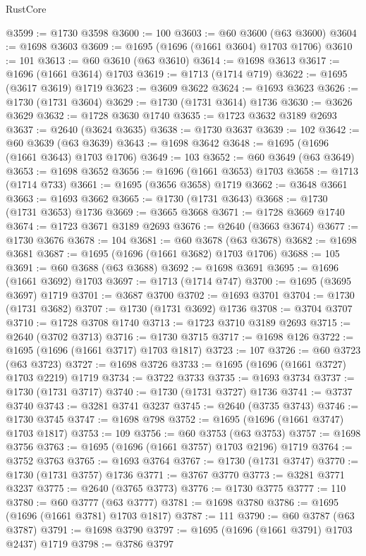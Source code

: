 \begin{lexlean}{RustCore}
\begin{coremodule}
@3599 := @1730 @3598
@3600 := 100
@3603 := @60 @3600 (@63 @3600)
@3604 := @1698 @3603
@3609 := @1695 (@1696 (@1661 @3604) @1703 @1706)
@3610 := 101
@3613 := @60 @3610 (@63 @3610)
@3614 := @1698 @3613
@3617 := @1696 (@1661 @3614) @1703
@3619 := @1713 (@1714 @719)
@3622 := @1695 (@3617 @3619) @1719
@3623 := @3609 @3622
@3624 := @1693 @3623
@3626 := @1730 (@1731 @3604)
@3629 := @1730 (@1731 @3614) @1736
@3630 := @3626 @3629
@3632 := @1728 @3630 @1740
@3635 := @1723 @3632 @3189 @2693
@3637 := @2640 (@3624 @3635)
@3638 := @1730 @3637
@3639 := 102
@3642 := @60 @3639 (@63 @3639)
@3643 := @1698 @3642
@3648 := @1695 (@1696 (@1661 @3643) @1703 @1706)
@3649 := 103
@3652 := @60 @3649 (@63 @3649)
@3653 := @1698 @3652
@3656 := @1696 (@1661 @3653) @1703
@3658 := @1713 (@1714 @733)
@3661 := @1695 (@3656 @3658) @1719
@3662 := @3648 @3661
@3663 := @1693 @3662
@3665 := @1730 (@1731 @3643)
@3668 := @1730 (@1731 @3653) @1736
@3669 := @3665 @3668
@3671 := @1728 @3669 @1740
@3674 := @1723 @3671 @3189 @2693
@3676 := @2640 (@3663 @3674)
@3677 := @1730 @3676
@3678 := 104
@3681 := @60 @3678 (@63 @3678)
@3682 := @1698 @3681
@3687 := @1695 (@1696 (@1661 @3682) @1703 @1706)
@3688 := 105
@3691 := @60 @3688 (@63 @3688)
@3692 := @1698 @3691
@3695 := @1696 (@1661 @3692) @1703
@3697 := @1713 (@1714 @747)
@3700 := @1695 (@3695 @3697) @1719
@3701 := @3687 @3700
@3702 := @1693 @3701
@3704 := @1730 (@1731 @3682)
@3707 := @1730 (@1731 @3692) @1736
@3708 := @3704 @3707
@3710 := @1728 @3708 @1740
@3713 := @1723 @3710 @3189 @2693
@3715 := @2640 (@3702 @3713)
@3716 := @1730 @3715
@3717 := @1698 @126
@3722 := @1695 (@1696 (@1661 @3717) @1703 @1817)
@3723 := 107
@3726 := @60 @3723 (@63 @3723)
@3727 := @1698 @3726
@3733 := @1695 (@1696 (@1661 @3727) @1703 @2219) @1719
@3734 := @3722 @3733
@3735 := @1693 @3734
@3737 := @1730 (@1731 @3717)
@3740 := @1730 (@1731 @3727) @1736
@3741 := @3737 @3740
@3743 := @3281 @3741 @3237
@3745 := @2640 (@3735 @3743)
@3746 := @1730 @3745
@3747 := @1698 @798
@3752 := @1695 (@1696 (@1661 @3747) @1703 @1817)
@3753 := 109
@3756 := @60 @3753 (@63 @3753)
@3757 := @1698 @3756
@3763 := @1695 (@1696 (@1661 @3757) @1703 @2196) @1719
@3764 := @3752 @3763
@3765 := @1693 @3764
@3767 := @1730 (@1731 @3747)
@3770 := @1730 (@1731 @3757) @1736
@3771 := @3767 @3770
@3773 := @3281 @3771 @3237
@3775 := @2640 (@3765 @3773)
@3776 := @1730 @3775
@3777 := 110
@3780 := @60 @3777 (@63 @3777)
@3781 := @1698 @3780
@3786 := @1695 (@1696 (@1661 @3781) @1703 @1817)
@3787 := 111
@3790 := @60 @3787 (@63 @3787)
@3791 := @1698 @3790
@3797 := @1695 (@1696 (@1661 @3791) @1703 @2437) @1719
@3798 := @3786 @3797

\end{coremodule}
\end{lexlean}

